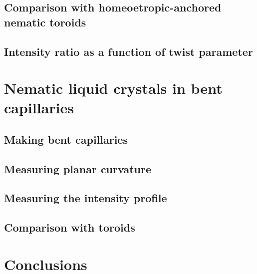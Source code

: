 \subsection{Comparison with homeoetropic-anchored nematic toroids}
\subsection{Intensity ratio as a function of twist parameter}

\section{Nematic liquid crystals in bent capillaries}
\subsection{Making bent capillaries}
\subsection{Measuring planar curvature}
\subsection{Measuring the intensity profile}
\subsection{Comparison with toroids}

\section{Conclusions}
